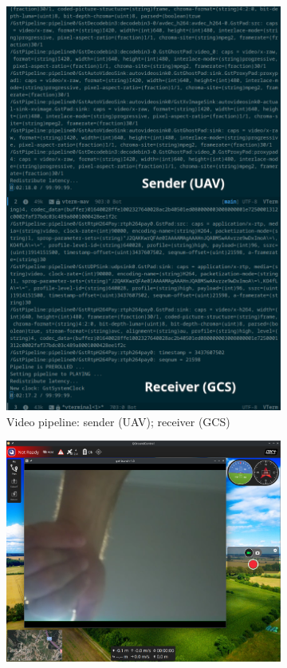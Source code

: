 \begin{figure}[htb!]
\begin{subfigure}[t]{.48\textwidth}
    \includegraphics[width=1.0\textwidth]{./img/png/px4-qgc-cam-3}
    \caption{Video pipeline: sender (UAV); receiver (GCS)}%
    \label{fig:px4-qgc-cam-3}
  \end{subfigure}
  \begin{subfigure}[t]{.48\textwidth}
    \includegraphics[width=1.0\textwidth]{./img/png/px4-qgc-cam-1}

\end{subfigure}
\end{figure}
